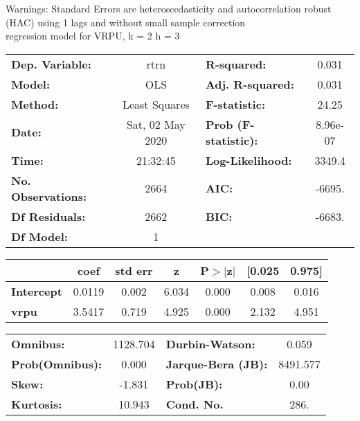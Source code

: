 Warnings: \newline
 [1] Standard Errors are heteroscedasticity and autocorrelation robust (HAC) using 1 lags and without small sample correction\\ 

regression model for VRPU, k = 2 h = 3\begin{center}
\begin{tabular}{lclc}
\toprule
\textbf{Dep. Variable:}    &       rtrn       & \textbf{  R-squared:         } &     0.031   \\
\textbf{Model:}            &       OLS        & \textbf{  Adj. R-squared:    } &     0.031   \\
\textbf{Method:}           &  Least Squares   & \textbf{  F-statistic:       } &     24.25   \\
\textbf{Date:}             & Sat, 02 May 2020 & \textbf{  Prob (F-statistic):} &  8.96e-07   \\
\textbf{Time:}             &     21:32:45     & \textbf{  Log-Likelihood:    } &    3349.4   \\
\textbf{No. Observations:} &        2664      & \textbf{  AIC:               } &    -6695.   \\
\textbf{Df Residuals:}     &        2662      & \textbf{  BIC:               } &    -6683.   \\
\textbf{Df Model:}         &           1      & \textbf{                     } &             \\
\bottomrule
\end{tabular}
\begin{tabular}{lcccccc}
                   & \textbf{coef} & \textbf{std err} & \textbf{z} & \textbf{P$> |$z$|$} & \textbf{[0.025} & \textbf{0.975]}  \\
\midrule
\textbf{Intercept} &       0.0119  &        0.002     &     6.034  &         0.000        &        0.008    &        0.016     \\
\textbf{vrpu}      &       3.5417  &        0.719     &     4.925  &         0.000        &        2.132    &        4.951     \\
\bottomrule
\end{tabular}
\begin{tabular}{lclc}
\textbf{Omnibus:}       & 1128.704 & \textbf{  Durbin-Watson:     } &    0.059  \\
\textbf{Prob(Omnibus):} &   0.000  & \textbf{  Jarque-Bera (JB):  } & 8491.577  \\
\textbf{Skew:}          &  -1.831  & \textbf{  Prob(JB):          } &     0.00  \\
\textbf{Kurtosis:}      &  10.943  & \textbf{  Cond. No.          } &     286.  \\
\bottomrule
\end{tabular}
\end{center}

